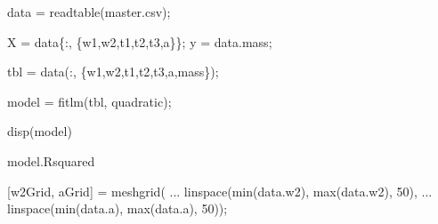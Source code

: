 \documentclass[
  letterpaper,
  DIV=11,
  numbers=noendperiod]{scrartcl}
\newenvironment{Shaded}{\begin{snugshade}}{\end{snugshade}}
\newcommand{\FloatTok}[1]{\textcolor[rgb]{0.68,0.00,0.00}{#1}}
\newcommand{\NormalTok}[1]{\textcolor[rgb]{0.00,0.23,0.31}{#1}}
\newcommand{\OperatorTok}[1]{\textcolor[rgb]{0.37,0.37,0.37}{#1}}
\newcommand{\SpecialStringTok}[1]{\textcolor[rgb]{0.13,0.47,0.30}{#1}}
\newcommand{\VariableTok}[1]{\textcolor[rgb]{0.07,0.07,0.07}{#1}}
\begin{document}
\begin{Shaded}
\begin{Highlighting}[]
\VariableTok{data} \OperatorTok{=} \VariableTok{readtable}\NormalTok{(}\SpecialStringTok{\textquotesingle{}master.csv\textquotesingle{}}\NormalTok{)}\OperatorTok{;}

\VariableTok{X} \OperatorTok{=} \VariableTok{data}\NormalTok{\{}\OperatorTok{:,}\NormalTok{ \{}\SpecialStringTok{\textquotesingle{}w1\textquotesingle{}}\OperatorTok{,}\SpecialStringTok{\textquotesingle{}w2\textquotesingle{}}\OperatorTok{,}\SpecialStringTok{\textquotesingle{}t1\textquotesingle{}}\OperatorTok{,}\SpecialStringTok{\textquotesingle{}t2\textquotesingle{}}\OperatorTok{,}\SpecialStringTok{\textquotesingle{}t3\textquotesingle{}}\OperatorTok{,}\SpecialStringTok{\textquotesingle{}a\textquotesingle{}}\NormalTok{\}\}}\OperatorTok{;}
\VariableTok{y} \OperatorTok{=} \VariableTok{data}\NormalTok{.}\VariableTok{mass}\OperatorTok{;}

\VariableTok{tbl} \OperatorTok{=} \VariableTok{data}\NormalTok{(}\OperatorTok{:,}\NormalTok{ \{}\SpecialStringTok{\textquotesingle{}w1\textquotesingle{}}\OperatorTok{,}\SpecialStringTok{\textquotesingle{}w2\textquotesingle{}}\OperatorTok{,}\SpecialStringTok{\textquotesingle{}t1\textquotesingle{}}\OperatorTok{,}\SpecialStringTok{\textquotesingle{}t2\textquotesingle{}}\OperatorTok{,}\SpecialStringTok{\textquotesingle{}t3\textquotesingle{}}\OperatorTok{,}\SpecialStringTok{\textquotesingle{}a\textquotesingle{}}\OperatorTok{,}\SpecialStringTok{\textquotesingle{}mass\textquotesingle{}}\NormalTok{\})}\OperatorTok{;}

\VariableTok{model} \OperatorTok{=} \VariableTok{fitlm}\NormalTok{(}\VariableTok{tbl}\OperatorTok{,} \SpecialStringTok{\textquotesingle{}quadratic\textquotesingle{}}\NormalTok{)}\OperatorTok{;}

\VariableTok{disp}\NormalTok{(}\VariableTok{model}\NormalTok{)}

\VariableTok{model}\NormalTok{.}\VariableTok{Rsquared}

\NormalTok{[}\VariableTok{w2Grid}\OperatorTok{,} \VariableTok{aGrid}\NormalTok{] }\OperatorTok{=} \VariableTok{meshgrid}\NormalTok{( }\OperatorTok{...}
    \VariableTok{linspace}\NormalTok{(}\VariableTok{min}\NormalTok{(}\VariableTok{data}\NormalTok{.}\VariableTok{w2}\NormalTok{)}\OperatorTok{,} \VariableTok{max}\NormalTok{(}\VariableTok{data}\NormalTok{.}\VariableTok{w2}\NormalTok{)}\OperatorTok{,} \FloatTok{50}\NormalTok{)}\OperatorTok{,} \OperatorTok{...}
    \VariableTok{linspace}\NormalTok{(}\VariableTok{min}\NormalTok{(}\VariableTok{data}\NormalTok{.}\VariableTok{a}\NormalTok{)}\OperatorTok{,}  \VariableTok{max}\NormalTok{(}\VariableTok{data}\NormalTok{.}\VariableTok{a}\NormalTok{)}\OperatorTok{,}  \FloatTok{50}\NormalTok{))}\OperatorTok{;}


\end{Highlighting}
\end{Shaded}
\end{document}
